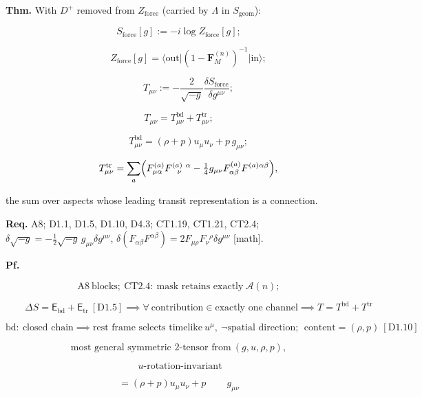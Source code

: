 \begin{theorem}\label{tag:CT1-22}
\textbf{Thm.} With $D^+$ removed from $Z_{\mathrm{force}}$ (carried by $\Lambda$ in $S_{\mathrm{geom}}$):

\[
S_{\mathrm{force}}[g]:=-i\log Z_{\mathrm{force}}[g];
\]

\[
\qquad Z_{\mathrm{force}}[g]=\bigl\langle\mathrm{out}\bigl|(1-\mathbf F_M^{(n)})^{-1}\bigr|\mathrm{in}\bigr\rangle;
\]

\[
\qquad T_{\mu\nu}:=-\frac{2}{\sqrt{-g}}\frac{\delta S_{\mathrm{force}}}{\delta g^{\mu\nu}};
\]

\[
T_{\mu\nu}=T^{\mathrm{bd}}_{\mu\nu}+T^{\mathrm{tr}}_{\mu\nu};
\]

\[
\qquad T^{\mathrm{bd}}_{\mu\nu}=(\rho+p)u_\mu u_\nu+p\,g_{\mu\nu};
\]

\[
\qquad T^{\mathrm{tr}}_{\mu\nu}=\sum_a\Bigl(F^{(a)}_{\mu\alpha}F^{(a)\ \alpha}_{\ \ \nu}-\tfrac14g_{\mu\nu}F^{(a)}_{\alpha\beta}F^{(a)\alpha\beta}\Bigr),
\]

the sum over aspects whose leading transit representation is a connection.

\textbf{Req.} A8; D1.1, D1.5, D1.10, D4.3; CT1.19, CT1.21, CT2.4; $\delta\sqrt{-g}=-\tfrac12\sqrt{-g}\,g_{\mu\nu}\delta g^{\mu\nu}$, $\delta(F_{\alpha\beta}F^{\alpha\beta})=2F_{\mu\rho}F_\nu{}^\rho\delta g^{\mu\nu}$ [math].

\textbf{Pf.}

\[
\mathrm{A8}\ \text{blocks};\ \mathrm{CT2.4}:\ \text{mask retains exactly}\ \mathcal A(n);
\]

\[
\qquad \Delta S=\mathsf E_{\mathrm{bd}}+\mathsf E_{\mathrm{tr}}\ [\mathrm{D1.5}]\implies\forall\ \text{contribution}\in\text{exactly one channel}\implies T=T^{\mathrm{bd}}+T^{\mathrm{tr}}
\]

\[
\text{bd}:\ \text{closed chain}\implies\text{rest frame selects timelike}\ u^\mu,\ \neg\text{spatial direction};\ \ \text{content}=(\rho,p)\ [\mathrm{D1.10}]
\]

\[
\text{most general symmetric 2-tensor from}\ (g,u,\rho,p),
\]

\[
\ u\text{-rotation-invariant}
\]

\[
= (\rho+p)u_\mu u_\nu+p\,\qquad g_{\mu\nu}
\]


\end{theorem}
